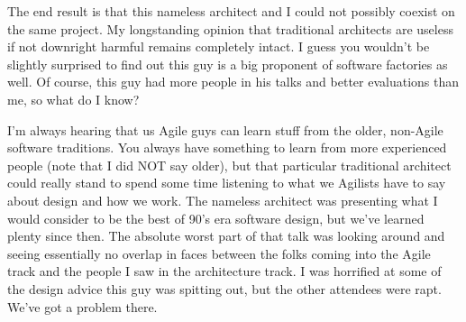 \documentclass{article}
\begin{document}
The end result is that this nameless architect and I could not possibly coexist on the same project.  My longstanding opinion that traditional architects are useless if not downright harmful remains completely intact.  I guess you wouldn't be slightly surprised to find out this guy is a big proponent of software factories as well.  Of course, this guy had more people in his talks and better evaluations than me, so what do I know?

I'm always hearing that us Agile guys can learn stuff from the older, non-Agile software traditions.  You always have something to learn from more experienced people (note that I did NOT say older), but that particular traditional architect could really stand to spend some time listening to what we Agilists have to say about design and how we work.  The nameless architect was presenting what I would consider to be the best of 90's era software design, but we've learned plenty since then.  The absolute worst part of that talk was looking around and seeing essentially no overlap in faces between the folks coming into the Agile track and the people I saw in the architecture track.  I was horrified at some of the design advice this guy was spitting out, but the other attendees were rapt.  We've got a problem there.
 
\end{document}
